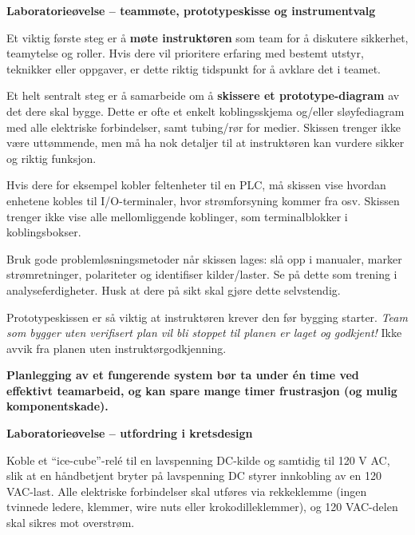 \vfil \eject

\noindent
{\bf Laboratorieøvelse -- teammøte, prototypeskisse og instrumentvalg}

\vskip 5pt

Et viktig første steg er å {\bf møte instruktøren} som team for å diskutere sikkerhet, teamytelse og roller. Hvis dere vil prioritere erfaring med bestemt utstyr, teknikker eller oppgaver, er dette riktig tidspunkt for å avklare det i teamet.

\vskip 10pt

Et helt sentralt steg er å samarbeide om å {\bf skissere et prototype-diagram} av det dere skal bygge. Dette er ofte et enkelt koblingsskjema og/eller sløyfediagram med alle elektriske forbindelser, samt tubing/rør for medier. Skissen trenger ikke være uttømmende, men må ha nok detaljer til at instruktøren kan vurdere sikker og riktig funksjon.

Hvis dere for eksempel kobler feltenheter til en PLC, må skissen vise hvordan enhetene kobles til I/O-terminaler, hvor strømforsyning kommer fra osv. Skissen trenger ikke vise alle mellomliggende koblinger, som terminalblokker i koblingsbokser.

Bruk gode problemløsningsmetoder når skissen lages: slå opp i manualer, marker strømretninger, polariteter og identifiser kilder/laster. Se på dette som trening i analyseferdigheter. Husk at dere på sikt skal gjøre dette selvstendig.

Prototypeskissen er så viktig at instruktøren krever den før bygging starter. {\it Team som bygger uten verifisert plan vil bli stoppet til planen er laget og godkjent!} Ikke avvik fra planen uten instruktørgodkjenning.

\vskip 10pt

{\bf Planlegging av et fungerende system bør ta under én time ved effektivt teamarbeid, og kan spare mange timer frustrasjon (og mulig komponentskade).}





\vfil \eject

\noindent
{\bf Laboratorieøvelse -- utfordring i kretsdesign}

\vskip 5pt

Koble et ``ice-cube''-relé til en lavspenning DC-kilde og samtidig til 120 V AC, slik at en håndbetjent bryter på lavspenning DC styrer innkobling av en 120 VAC-last. Alle elektriske forbindelser skal utføres via rekkeklemme (ingen tvinnede ledere, klemmer, wire nuts eller krokodilleklemmer), og 120 VAC-delen skal sikres mot overstrøm.


